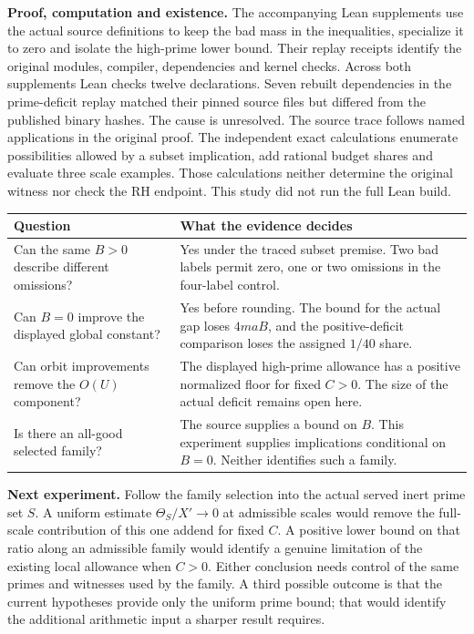 \documentclass[12pt,letterpaper]{article}
\newcommand{\para}[1]{\par\medskip\noindent\textbf{#1}\quad}
\begin{document}
\para{Proof, computation and existence.} The accompanying Lean supplements use the actual source definitions to keep the bad mass in the inequalities, specialize it to zero and isolate the high-prime lower bound. Their replay receipts identify the original modules, compiler, dependencies and kernel checks. Across both supplements Lean checks twelve declarations. Seven rebuilt dependencies in the prime-deficit replay matched their pinned source files but differed from the published binary hashes. The cause is unresolved. The source trace follows named applications in the original proof. The independent exact calculations enumerate possibilities allowed by a subset implication, add rational budget shares and evaluate three scale examples. Those calculations neither determine the original witness nor check the RH endpoint. This study did not run the full Lean build.
\par\smallskip
\begin{tabularx}{\linewidth}{@{} >{\raggedright\arraybackslash}p{.28\linewidth}Y@{}}
\toprule
Question & What the evidence decides\\\midrule
Can the same \(B>0\) describe different omissions? & Yes under the traced subset premise. Two bad labels permit zero, one or two omissions in the four-label control.\\[3pt]
Can \(B=0\) improve the displayed global constant? & Yes before rounding. The bound for the actual gap loses \(4maB\), and the positive-deficit comparison loses the assigned \(1/40\) share.\\[3pt]
Can orbit improvements remove the \(O(U)\) component? & The displayed high-prime allowance has a positive normalized floor for fixed \(C>0\). The size of the actual deficit remains open here.\\[3pt]
Is there an all-good selected family? & The source supplies a bound on \(B\). This experiment supplies implications conditional on \(B=0\). Neither identifies such a family.\\\bottomrule
\end{tabularx}

\para{Next experiment.} Follow the family selection into the actual served inert prime set \(S\). A uniform estimate \(\Theta_S/X'\to0\) at admissible scales would remove the full-scale contribution of this one addend for fixed \(C\). A positive lower bound on that ratio along an admissible family would identify a genuine limitation of the existing local allowance when \(C>0\). Either conclusion needs control of the same primes and witnesses used by the family. A third possible outcome is that the current hypotheses provide only the uniform prime bound; that would identify the additional arithmetic input a sharper result requires.

\end{document}
